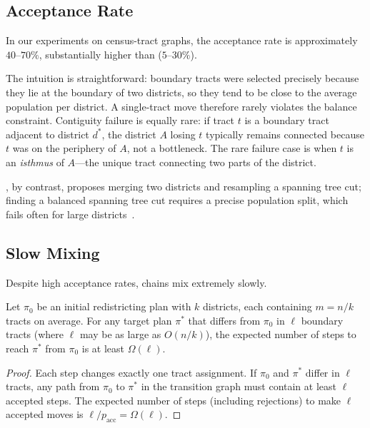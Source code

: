 \subsection{Acceptance Rate}

\begin{proposition}
\label{prop:accept}
In our experiments on census-tract graphs, the \flip{} acceptance rate
is approximately $40$--$70\%$, substantially higher than \recom{} ($5$--$30\%$).
\end{proposition}

The intuition is straightforward: boundary tracts were selected precisely
because they lie at the boundary of two districts, so they tend to be close
to the average population per district.
A single-tract move therefore rarely violates the balance constraint.
Contiguity failure is equally rare: if tract $t$ is a boundary tract adjacent
to district $d^*$, the district $A$ losing $t$ typically remains connected
because $t$ was on the periphery of $A$, not a bottleneck.
The rare failure case is when $t$ is an \emph{isthmus} of $A$---the unique
tract connecting two parts of the district.

\recom{}, by contrast, proposes merging two districts and resampling a
spanning tree cut; finding a balanced spanning tree cut requires a precise
population split, which fails often for large districts~\citep{deford2021}.

\subsection{Slow Mixing}

Despite high acceptance rates, \flip{} chains mix extremely slowly.

\begin{theorem}
\label{thm:slow-mix}
Let $\pi_0$ be an initial redistricting plan with $k$ districts, each
containing $m = n/k$ tracts on average.
For any target plan $\pi^*$ that differs from $\pi_0$ in $\ell$ boundary
tracts (where $\ell$ may be as large as $O(n/k)$), the expected number of
\flip{} steps to reach $\pi^*$ from $\pi_0$ is at least $\Omega(\ell)$.
\end{theorem}

\begin{proof}
Each \flip{} step changes exactly one tract assignment.
If $\pi_0$ and $\pi^*$ differ in $\ell$ tracts, any path from $\pi_0$ to
$\pi^*$ in the \flip{} transition graph must contain at least $\ell$ accepted
steps.
The expected number of steps (including rejections) to make $\ell$ accepted
moves is $\ell / p_{\mathrm{acc}} = \Omega(\ell)$.
\end{proof}

